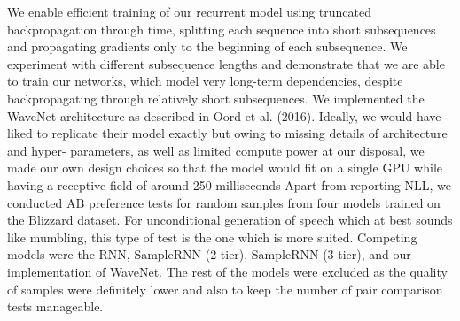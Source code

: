 We enable efficient training of our recurrent model using truncated backpropagation through time, splitting each sequence into short subsequences and propagating gradients only to the beginning of each subsequence. We experiment with different subsequence lengths and demonstrate that we are able to train our networks, which model very long-term dependencies, despite backpropagating through relatively short subsequences.
We implemented the WaveNet architecture as described in Oord et al. (2016). Ideally, we would have liked to replicate their model exactly but owing to missing details of architecture and hyper- parameters, as well as limited compute power at our disposal, we made our own design choices so that the model would fit on a single GPU while having a receptive field of around 250 milliseconds
Apart from reporting NLL, we conducted AB preference tests for random samples from four models trained on the Blizzard dataset. For unconditional generation of speech which at best sounds like mumbling, this type of test is the one which is more suited. Competing models were the RNN, SampleRNN (2-tier), SampleRNN (3-tier), and our implementation of WaveNet. The rest of the models were excluded as the quality of samples were definitely lower and also to keep the number of pair comparison tests manageable.

